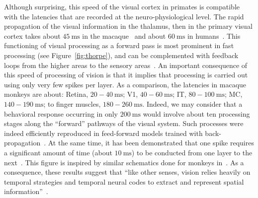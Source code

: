 \documentclass[brainsci, %
               review,submit,pdftex,moreauthors
               ]{Definitions/mdpi}
\newcommand{\ms}{\si{\milli\second}}%
\begin{document}
Although surprising, this speed of the visual cortex in primates is compatible with the latencies that are recorded at the neuro-physiological level. The rapid propagation of the visual information in the thalamus, then in the primary visual cortex takes about $45~\ms$ in the macaque~\citep{schmolesky_signal_1998} and about $60~\ms$ in humans~\citep{vanni_coinciding_2001}. This functioning of visual processing as a forward pass is most prominent in fast processing (see Figure~\ref{fig:thorpe}), and can be complemented with feedback loops from the higher areas to the sensory areas~\citep{lamme_distinct_2000}. An important consequence of this speed of processing of vision is that it implies that processing is carried out using only very few spikes per layer. As a comparison, the latencies in macaque monkeys are about: Retina, $20-40~\ms$; V1, $40-60~\ms$; IT, $80-100~\ms$; MC, $140-190~\ms$; to finger muscles, $180-260~\ms$. Indeed, we may consider that a behavioral response occurring in only $200~\ms$ would involve about ten processing stages along the ``forward'' pathways of the visual system. Such processes were indeed efficiently reproduced in feed-forward models trained with back-propagation~\citep{serre_feedforward_2007,jeremie_ultrafast_2022}. At the same time, it has been demonstrated that one spike requires a significant amount of time (about $10~\ms$) to be conducted from one layer to the next~\citep{nowak_timing_1997,thorpe_seeking_2001}.  This figure is inspired by similar schematics done for monkeys in~\citep{thorpe_seeking_2001}. As a consequence, these results suggest that ``like other senses, vision relies heavily on temporal strategies and temporal neural codes to extract and represent spatial information''~\citep{rucci_temporal_2018}.
\end{document}
